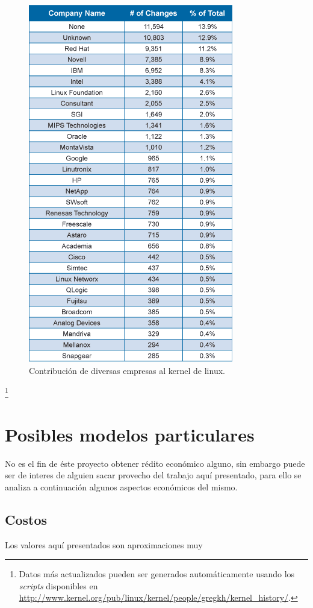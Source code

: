 \begin{figure}
\centering
\includegraphics[scale=0.6]{./img/table4-companies.png}
\caption{Contribuci\'on de diversas empresas al kernel de linux.}
\label{fig:companies_contributions_to_linux}
\end{figure}\footnote{Datos m\'as actualizados pueden ser generados
autom\'aticamente usando los \emph{scripts} disponibles en
\url{http://www.kernel.org/pub/linux/kernel/people/gregkh/kernel_history/}.}


\section{Posibles modelos particulares}
%
No es el fin de \'este proyecto obtener r\'edito econ\'omico alguno, sin
embargo puede ser de interes de alguien sacar provecho del trabajo aqu\'i
presentado, para ello se analiza a continuaci\'on algunos aspectos
econ\'omicos del mismo.

\subsection{Costos}
Los valores aqu\'i presentados son aproximaciones muy %

